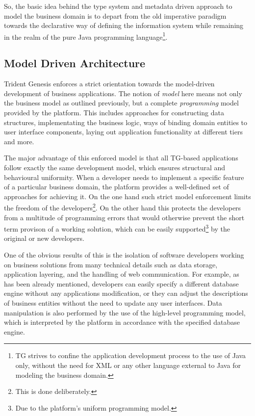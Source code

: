   So, the basic idea behind the type system and metadata driven approach to model the business domain is to depart from the old imperative paradigm towards the declarative way of defining the information system while remaining in the realm of the pure Java programming language\footnote{TG strives to confine the application development process to the use of Java only, without the need for XML or any other language external to Java for modeling the business domain.}.
  
  \subsection{Model Driven Architecture}
  Trident Genesis enforces a strict orientation towards the model-driven development of business applications.
  The notion of \emph{model} here means not only the business model as outlined previously, but a complete \emph{programming} model provided by the platform.
  This includes approaches for constructing data structures, implementating the business logic, ways of binding domain entities to user interface components, laying out application functionality at different tiers and more.

  The major advantage of this enforced model is that all TG-based applications follow exactly the same development model, which ensures structural and behavioural uniformity.
  When a developer needs to implement a specific feature of a particular business domain, the platform provides a well-defined set of approaches for achieving it.
  On the one hand such strict model enforcement limits the freedom of the developers\footnote{This is done deliberately.}.
  On the other hand this protects the developers from a multitude of programming errors that would otherwise prevent the short term provison of a working solution, which can be easily supported\footnote{Due to the platform's uniform programming model.} by the original or new developers.

  One of the obvious results of this is the isolation of software developers working on business solutions from many technical details such as data storage, application layering, and the handling of web communication.
  For example, as has been already mentioned, developers can easily specify a different database engine without any applications modification, or they can adjust the descriptions of business entities without the need to update any user interfaces.
  Data manipulation is also performed by the use of the high-level programming model, which is interpreted by the platform in accordance with the specified database engine.
  

